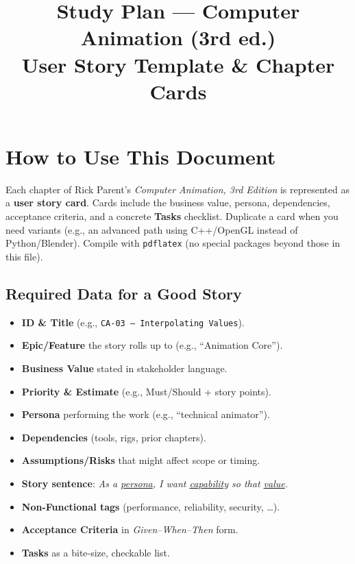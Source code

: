 \documentclass[11pt,a4paper]{article}
\title{\textbf{Study Plan — Computer Animation (3rd ed.)}\\
\large User Story Template \& Chapter Cards}
\author{}
\date{\vspace{-0.5em}}
\begin{document}
\maketitle

\section*{How to Use This Document}
Each chapter of Rick Parent's \emph{Computer Animation, 3rd Edition} is represented as a \textbf{user story card}. Cards include the business value, persona, dependencies, acceptance criteria, and a concrete \textbf{Tasks} checklist. Duplicate a card when you need variants (e.g., an advanced path using C++/OpenGL instead of Python/Blender). Compile with \texttt{pdflatex} (no special packages beyond those in this file).

\subsection*{Required Data for a Good Story}
\begin{itemize}
  \item \textbf{ID \& Title} (e.g., \texttt{CA-03 --- Interpolating Values}).
  \item \textbf{Epic/Feature} the story rolls up to (e.g., ``Animation Core'').
  \item \textbf{Business Value} stated in stakeholder language.
  \item \textbf{Priority \& Estimate} (e.g., Must/Should + story points).
  \item \textbf{Persona} performing the work (e.g., ``technical animator'').
  \item \textbf{Dependencies} (tools, rigs, prior chapters).
  \item \textbf{Assumptions/Risks} that might affect scope or timing.
  \item \textbf{Story sentence}: \emph{As a \underline{persona}, I want \underline{capability} so that \underline{value}.}
  \item \textbf{Non-Functional tags} (performance, reliability, security, \dots).
  \item \textbf{Acceptance Criteria} in \emph{Given--When--Then} form.
  \item \textbf{Tasks} as a bite-size, checkable list.
\end{itemize}
\end{document}
